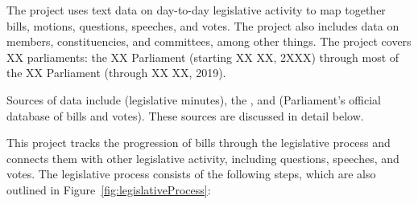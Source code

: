 
The project uses text data on day-to-day legislative activity to map together bills, motions, questions, speeches, and votes. The project also includes data on members, constituencies, and committees, among other things. The project covers XX parliaments: the XX Parliament (starting XX XX, 2XXX) through most of the XX Parliament (through XX XX, 2019). %

Sources of data include  (legislative minutes), the , and \href{https://commonsvotes.digiminster.com/}{} (Parliament's official database of bills and votes). These sources are discussed in detail below.

\myline


This project tracks the progression of bills through the legislative process and connects them with other legislative activity, including questions, speeches, and votes. The legislative process consists of the following steps, which are also outlined in Figure~\ref{fig:legislativeProcess}:

